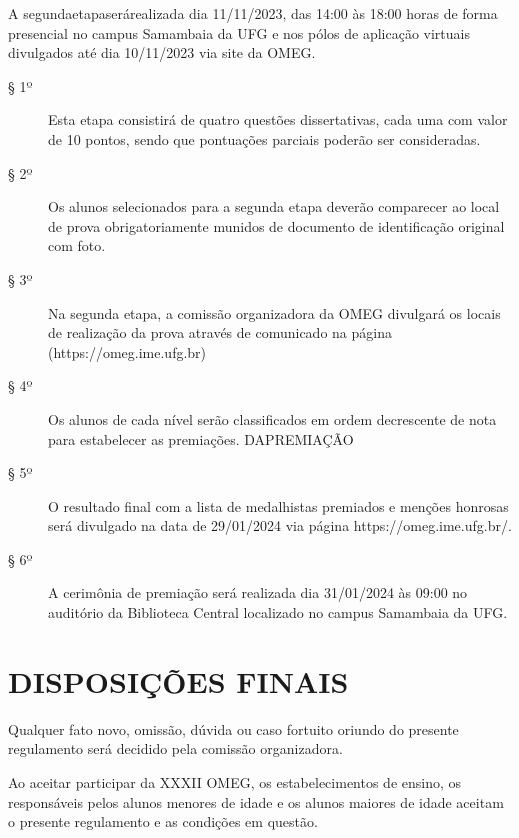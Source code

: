 \begin{article}
  A segundaetapaserárealizada dia 11/11/2023, das 14:00 às 18:00 horas de
  forma presencial no campus Samambaia da UFG e nos pólos de aplicação
  virtuais divulgados até dia 10/11/2023 via site da OMEG.
  \begin{description}
    \item[§ 1º]
      Esta etapa consistirá de quatro questões dissertativas, cada uma com
      valor de 10 pontos, sendo que pontuações parciais poderão ser
      consideradas.
    \item[§ 2º]
      Os alunos selecionados para a segunda etapa deverão comparecer ao
      local de prova obrigatoriamente munidos de documento de identificação
      original com foto.
    \item[§ 3º]
      Na segunda etapa, a comissão organizadora da OMEG divulgará os
      locais de realização da prova através de comunicado na página
      (https://omeg.ime.ufg.br)
    \item[§ 4º]
      Os alunos de cada nível serão classificados em ordem decrescente de
      nota para estabelecer as premiações.
      DAPREMIAÇÃO
    \item[§ 5º]
      O resultado final com a lista de medalhistas premiados e menções
      honrosas será divulgado na data de 29/01/2024 via página
      https://omeg.ime.ufg.br/.
    \item[§ 6º]
      A cerimônia de premiação será realizada dia 31/01/2024 às 09:00 no
      auditório da Biblioteca Central localizado no campus Samambaia da UFG.
  \end{description}
\end{article}

\section{DISPOSIÇÕES FINAIS}

\begin{article}
  Qualquer fato novo, omissão, dúvida ou caso fortuito oriundo do presente
  regulamento será decidido pela comissão organizadora.
\end{article}

\begin{article}
  Ao aceitar participar da XXXII OMEG, os estabelecimentos de ensino, os
  responsáveis pelos alunos menores de idade e os alunos maiores de idade
  aceitam o presente regulamento e as condições em questão.
\end{article}


